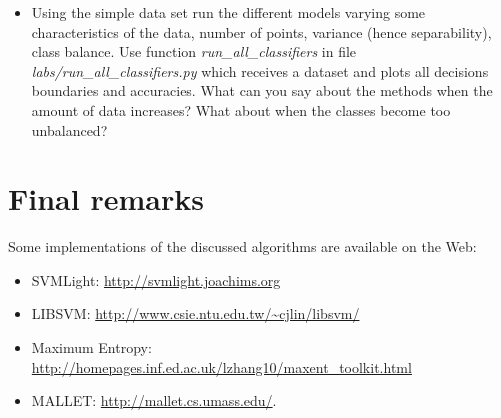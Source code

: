 \begin{exercise}
\begin{itemize}
\item Using the simple data set run the different models varying some
  characteristics of the data, number of points, variance (hence
  separability), class balance. Use function
  \emph{run\_all\_classifiers} in file \emph{labs/run\_all\_classifiers.py} which receives a
  dataset and plots all decisions boundaries and accuracies. What can
  you say about the methods when the amount of data increases? What
  about when the classes become too unbalanced?
\end{itemize}
\end{exercise}


\section{Final remarks}


Some implementations of the discussed algorithms are available on the Web: 
\begin{itemize}
\item SVMLight: \url{http://svmlight.joachims.org}
\item LIBSVM: \url{http://www.csie.ntu.edu.tw/~cjlin/libsvm/}
\item Maximum Entropy: \url{http://homepages.inf.ed.ac.uk/lzhang10/maxent_toolkit.html}
\item MALLET: \url{http://mallet.cs.umass.edu/}.
\end{itemize} 


